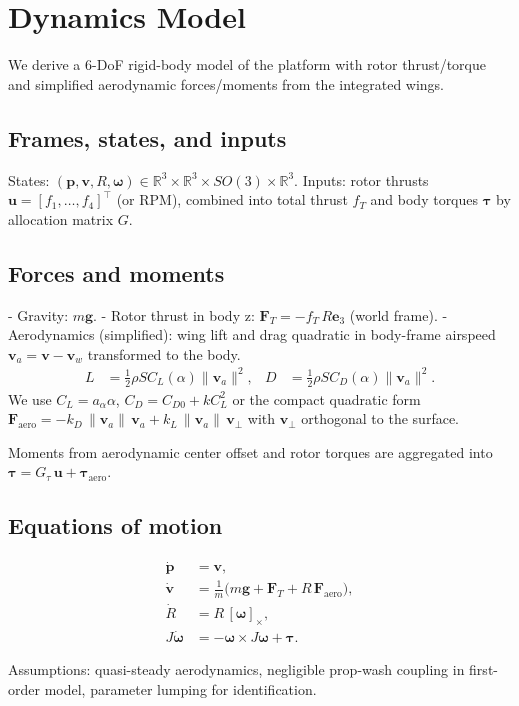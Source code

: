 
\chapter{Dynamics Model}\label{chapter:dynamics-model}

We derive a 6-DoF rigid-body model of the platform with rotor thrust/torque and simplified aerodynamic forces/moments from the integrated wings.

\section{Frames, states, and inputs}
States: $(\mathbf{p},\mathbf{v},R,\boldsymbol{\omega}) \in \mathbb{R}^3\times\mathbb{R}^3\times SO(3)\times\mathbb{R}^3$. Inputs: rotor thrusts $\mathbf{u}=[f_1,\dots,f_4]^\top$ (or RPM), combined into total thrust $f_T$ and body torques $\boldsymbol{\tau}$ by allocation matrix $G$.

\section{Forces and moments}
- Gravity: $m\mathbf{g}$.
- Rotor thrust in body z: $\mathbf{F}_T = -f_T\, R\mathbf{e}_3$ (world frame).
- Aerodynamics (simplified): wing lift and drag quadratic in body-frame airspeed $\mathbf{v}_a = \mathbf{v} - \mathbf{v}_w$ transformed to the body.
  \begin{align}
  L &= \tfrac{1}{2}\rho S C_L(\alpha) \|\mathbf{v}_a\|^2, & D &= \tfrac{1}{2}\rho S C_D(\alpha) \|\mathbf{v}_a\|^2.
  \end{align}
We use $C_L=a_\alpha\alpha$, $C_D=C_{D0}+kC_L^2$ or the compact quadratic form $\mathbf{F}_\text{aero} = -k_D\,\|\mathbf{v}_a\|\,\mathbf{v}_a + k_L\,\|\mathbf{v}_a\|\,\mathbf{v}_{\perp}$ with $\mathbf{v}_{\perp}$ orthogonal to the surface.

Moments from aerodynamic center offset and rotor torques are aggregated into $\boldsymbol{\tau}=G_\tau\,\mathbf{u} + \boldsymbol{\tau}_\text{aero}$.

\section{Equations of motion}
\begin{align}
\dot{\mathbf{p}} &= \mathbf{v},\\
\dot{\mathbf{v}} &= \tfrac{1}{m}\big( m\mathbf{g} + \mathbf{F}_T + R\,\mathbf{F}_\text{aero} \big),\\
\dot{R} &= R\,[\boldsymbol{\omega}]_\times,\\
J\dot{\boldsymbol{\omega}} &= -\boldsymbol{\omega}\times J\boldsymbol{\omega} + \boldsymbol{\tau}.
\end{align}

Assumptions: quasi-steady aerodynamics, negligible prop-wash coupling in first-order model, parameter lumping for identification.
